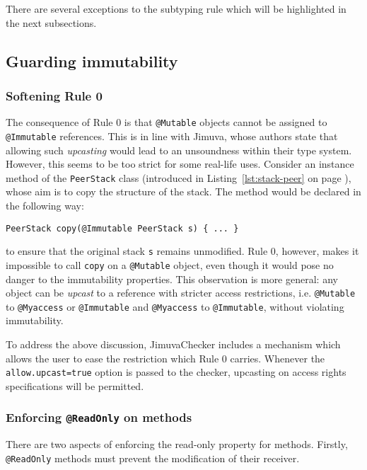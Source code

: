 \documentclass{pracamgr}
\theoremstyle{break}
\theoremstyle{break}
\theoremstyle{break}
\begin{document}
There are several exceptions to the subtyping rule which will be
highlighted in the next subsections. 

\subsection{Guarding immutability}

\subsubsection{Softening Rule 0}

The consequence of Rule 0 is that \texttt{@Mutable} objects cannot be
assigned to \texttt{@Immutable} references. This is in line with
Jimuva, whose authors state that allowing such \emph{upcasting} would
lead to an unsoundness within their type system. However, this seems
to be too strict for some real-life uses. Consider an instance method
of the \texttt{PeerStack} class (introduced in
Listing~\ref{lst:stack-peer} on page \pageref{lst:stack-peer}), whose
aim is to copy the structure of the stack. The method would be
declared in the following way:
\begin{lstlisting}
PeerStack copy(@Immutable PeerStack s) { ... }
\end{lstlisting}
to ensure that the original stack \texttt{s} remains unmodified. Rule
0, however, makes it impossible to call \texttt{copy} on a
\texttt{@Mutable} object, even though it would pose no danger to the
immutability properties. This observation is more general: any object
can be \emph{upcast} to a reference with stricter access restrictions,
i.e. \texttt{@Mutable} to \texttt{@Myaccess} or \texttt{@Immutable}
and \texttt{@Myaccess} to \texttt{@Immutable}, without violating
immutability.

To address the above discussion, JimuvaChecker includes a mechanism
which allows the user to ease the restriction which Rule 0
carries. Whenever the \texttt{allow.upcast=true} option is passed to
the checker, upcasting on access rights specifications will be
permitted.

\subsubsection{Enforcing \texttt{@ReadOnly} on methods} 

There are two aspects of enforcing the read-only property for methods.
Firstly, \texttt{@ReadOnly} methods must prevent the modification of
their receiver.
\end{document}
